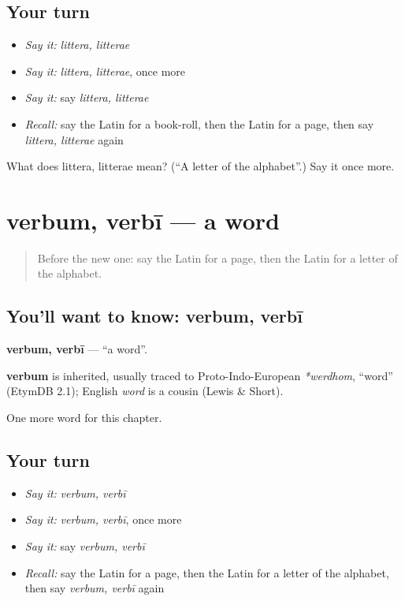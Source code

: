 \subsection*{Your turn}
\begin{itemize}
\raggedright
  \item \emph{Say it:} \emph{littera, litterae}
  \item \emph{Say it:} \emph{littera, litterae}, once more
  \item \emph{Say it:} say \emph{littera, litterae}
  \item \emph{Recall:} say the Latin for a book-roll, then the Latin for a page, then say \emph{littera, litterae} again
\end{itemize}

\begin{tcolorbox}[breakable,colback=teal!4,colframe=teal!35!black,title={Before you move on}]
What does littera, litterae mean? (\textquotedblleft{}A letter of the alphabet\textquotedblright{}.) Say it once more.
\end{tcolorbox}
\section[verbum, verbī]{verbum, verbī — a word}

\label{lesson:LA-C278-verbum}



\begin{quote}
Before the new one: say the Latin for a page, then the Latin for a letter of the alphabet.
\end{quote}

\subsection*{You'll want to know: verbum, verbī}
\textbf{verbum, verbī} — \textquotedblleft{}a word\textquotedblright{}.

\begin{cousinweb}
\textbf{verbum} is inherited, usually traced to Proto-Indo-European \emph{*werdhom}, \textquotedblleft{}word\textquotedblright{} (EtymDB 2.1); English \emph{word} is a cousin (Lewis \& Short).
\end{cousinweb}

\begin{grammarlens}[title={What you've built}]
One more word for this chapter.
\end{grammarlens}

\subsection*{Your turn}
\begin{itemize}
\raggedright
  \item \emph{Say it:} \emph{verbum, verbī}
  \item \emph{Say it:} \emph{verbum, verbī}, once more
  \item \emph{Say it:} say \emph{verbum, verbī}
  \item \emph{Recall:} say the Latin for a page, then the Latin for a letter of the alphabet, then say \emph{verbum, verbī} again
\end{itemize}

